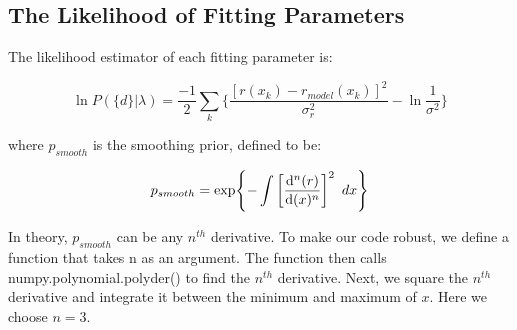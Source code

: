 \subsection{The Likelihood of Fitting Parameters}
\label{subsec:likelihood}

The likelihood estimator of each fitting parameter is:

\begin{equation}
\label{likelihood}
\ln{P(\{d\}|\lambda)} = \frac{-1}{2}\sum_{k} \bigg\{\frac{[r(x_k) -r_{model}(x_k)]^2}{\sigma_r^2} - \ln{\frac{1}{\sigma^2}}\bigg\}
\end{equation}

where $p_{smooth}$ is the smoothing prior, defined to be:

\begin{equation}
\label{smoothing_prior}
p_{smooth} = \exp{-\int \bigg[\dv[n]{(r)}{(x)}\bigg]^2 \hspace{5pt} dx}
\end{equation}

In theory, $p_{smooth}$ can be any $n^{th}$ derivative. To make our code robust, we define a function that takes n as an argument. The function then calls numpy.polynomial.polyder() to find the $n^{th}$ derivative. Next, we square the $n^{th}$ derivative and integrate it between the minimum and maximum of $x$. Here we choose $n = 3$.